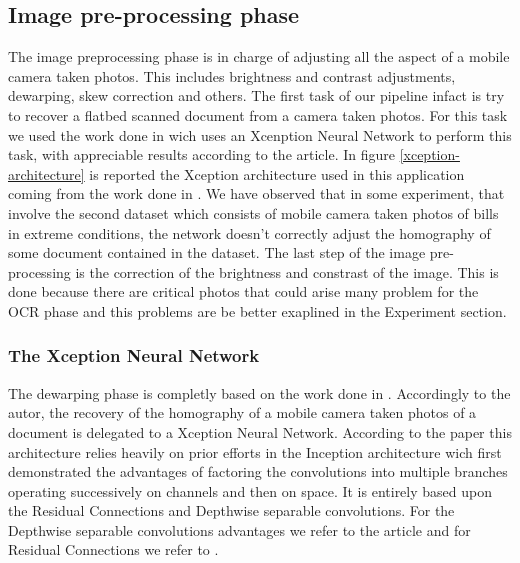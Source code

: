 \documentclass[10pt,twocolumn,letterpaper]{article}
\begin{document}
\subsection{Image pre-processing phase}
The image preprocessing phase is in charge of adjusting all the aspect of a mobile camera taken photos. This includes brightness and contrast adjustments, dewarping, skew correction and others. The first task of our pipeline infact is try to recover a flatbed scanned document from a camera taken photos. For this task we used the work done in \cite{mobile-ocr} wich uses an Xcenption Neural Network \cite{xception_NN} to perform this task, with appreciable results according to the article. In figure \ref{xception-architecture} is reported the Xception architecture used in this application coming from the work done in \cite{Improvingcamera-based}. We have observed that in some experiment, that involve the second dataset which consists of mobile camera taken photos of bills in extreme conditions, the network doesn't correctly adjust the homography of some document contained in the dataset. The last step of the image pre-processing is the correction of the brightness and constrast of the image. This is done because there are critical photos that could arise many problem for the OCR phase and this problems are be better exaplined in the Experiment section.

\subsubsection{The Xception Neural Network}
The dewarping phase is completly based on the work done in \cite{mobile-ocr}. Accordingly to the autor, the recovery of the homography of a mobile camera taken photos of a document is delegated to a Xception Neural Network. According to the paper \cite{xception} this architecture relies heavily on prior efforts in the Inception architecture wich first demonstrated the advantages of factoring the convolutions into multiple branches operating successively on channels and then on space. It is entirely based upon the Residual Connections and Depthwise separable convolutions. For the Depthwise separable convolutions advantages we refer to the article \cite{https://towardsdatascience.com/a-basic-introduction-to-separable-convolutions-b99ec3102728} and for Residual Connections we refer to \cite{https://towardsdatascience.com/residual-blocks-building-blocks-of-resnet-fd90ca15d6ec}.
\end{document}
